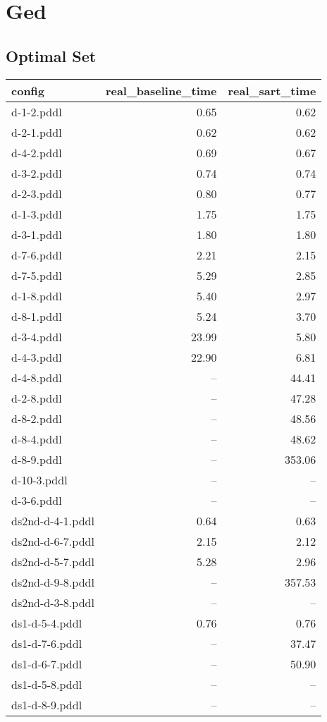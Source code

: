 \documentclass{article}
\begin{document}
                \newpage \section{Ged}
                    \subsection*{Optimal Set}
                    
                            \begin{center}
                            \scriptsize
                            \begin{tabular}{@{}l|r|r@{}}
                            config & real\_baseline\_time & real\_sart\_time\\\midrule
                             d-1-2.pddl&0.65&0.62\\
 d-2-1.pddl&0.62&0.62\\
 d-4-2.pddl&0.69&0.67\\
 d-3-2.pddl&0.74&0.74\\
 d-2-3.pddl&0.80&0.77\\
 d-1-3.pddl&1.75&1.75\\
 d-3-1.pddl&1.80&1.80\\
 d-7-6.pddl&2.21&2.15\\
 d-7-5.pddl&5.29&2.85\\
 d-1-8.pddl&5.40&2.97\\
 d-8-1.pddl&5.24&3.70\\
 d-3-4.pddl&23.99&5.80\\
 d-4-3.pddl&22.90&6.81\\
 d-4-8.pddl&--&44.41\\
 d-2-8.pddl&--&47.28\\
 d-8-2.pddl&--&48.56\\
 d-8-4.pddl&--&48.62\\
 d-8-9.pddl&--&353.06\\
 d-10-3.pddl&--&--\\
 d-3-6.pddl&--&--\\
 ds2nd-d-4-1.pddl&0.64&0.63\\
 ds2nd-d-6-7.pddl&2.15&2.12\\
 ds2nd-d-5-7.pddl&5.28&2.96\\
 ds2nd-d-9-8.pddl&--&357.53\\
 ds2nd-d-3-8.pddl&--&--\\
 ds1-d-5-4.pddl&0.76&0.76\\
 ds1-d-7-6.pddl&--&37.47\\
 ds1-d-6-7.pddl&--&50.90\\
 ds1-d-5-8.pddl&--&--\\
 ds1-d-8-9.pddl&--&--
                            \end{tabular}
                            \end{center}
                    
\end{document}
